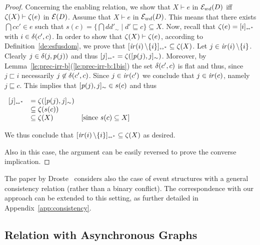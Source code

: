 \begin{proof}
  Concerning the enabling relation, we show that $X \vdash e$ in
  $\mathcal{E}_{wd}({D})$ iff $\mathop{\mathit{\zeta}}(X) \vdash \mathop{\mathit{\zeta}}(e)$ in $\mathcal{E}({D})$.
  Assume that $X \vdash e$ in $\mathcal{E}_{wd}({D})$. This means that there exists
  $\dint{c}{c'} \in e$ such that
  $s(c) = \{ \dint{d}{d'}_{\sim} \mid d' \sqsubseteq c \} \subseteq
  X$.
  Now, recall that $\mathop{\mathit{\zeta}}(e) = [{i}]_{\scriptscriptstyle {\leftrightarrow^*}}$ with
  $i \in \delta({c'},{c})$.
  In order to show that $\mathop{\mathit{\zeta}}(X) \vdash \mathop{\mathit{\zeta}}(e)$, according to
  Definition~\ref{de:esfusdom}, we prove that
  $[{\mathop{\mathit{ir}({i})} \setminus \{ i\}}]_{\scriptscriptstyle {\leftrightarrow^*}} \subseteq \mathop{\mathit{\zeta}}(X)$.
  Let $j \in \mathop{\mathit{ir}({i})} \setminus \{ i \}$. Clearly
  $j \in \delta({j},{\mathit{p}({j})})$ and thus
  $[{j}]_{\scriptscriptstyle {\leftrightarrow^*}} = \mathop{\mathit{\zeta}}([{\mathit{p}({j})},{j}]_{\sim})$.
  Moreover, by
  Lemma~\ref{le:prec-irr-b}(\ref{le:prec-irr-b:1bis}) the set
  $\delta({c'},{c})$ is flat and thus, since $j \sqsubset i$
  necessarily $j \not\in \delta({c'},{c})$. Since
  $j \in \mathop{\mathit{ir}({c'})}$ we conclude that $j \in \mathop{\mathit{ir}({c})}$, namely
  $j \sqsubseteq c$.
  This implies that $[{\mathit{p}({j})},{j}]_{\sim} \in s(c)$ and thus
  \begin{center}
    $
    \begin{array}{lll}
      [{j}]_{\scriptscriptstyle {\leftrightarrow^*}} & = \mathop{\mathit{\zeta}}([{\mathit{p}({j})},{j}]_{\sim}) & \\
      & \subseteq \mathop{\mathit{\zeta}}(s(c)) & \\
      & \subseteq \mathop{\mathit{\zeta}}(X) & \mbox{[since $s(c) \subseteq X$]}
    \end{array}
    $
  \end{center}
  We thus conclude that
  $[{\mathop{\mathit{ir}({i})} \setminus \{ i\}}]_{\scriptscriptstyle {\leftrightarrow^*}} \subseteq \mathop{\mathit{\zeta}}(X)$ as desired.

  Also in this case, the argument can be easily reversed to prove the
  converse implication.
\end{proof}

The paper by Droste~\cite{Dro:ESD} considers also the case of event
structures with a general consistency relation (rather than a binary
conflict). The correspondence with our approach can be extended to this setting, as further detailed in Appendix~\ref{app:consistency}.


\subsection{Relation with Asynchronous Graphs}
\label{ss:async-graphs}
 
